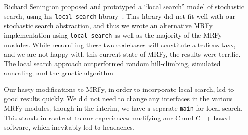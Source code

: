 Richard Senington proposed and prototyped a ``local search'' model of
stochastic search, using his \texttt{local-search} library~\cite{}.
This library did not fit well with our stochastic search abstraction, and
thus we wrote an alternative MRFy implementation using \texttt{local-search}
as well as the majority of the MRFy modules.
While reconciling these two codebases will constitute a tedious task, and we are
not happy with this current state of MRFy, the results were terrific.
The local search approach outperformed random hill-climbing, simulated
annealing, and the genetic algorithm.

Our hasty modifications to MRFy, in order to incorporate local search, led to
good results quickly.
We did not need to change any interfaces in the various MRFy modules, though in
the interim, we have a separate \texttt{main} for local search.
This stands in contrast to our experiences modifying our C and C++-based
software, which inevitably led to headaches.